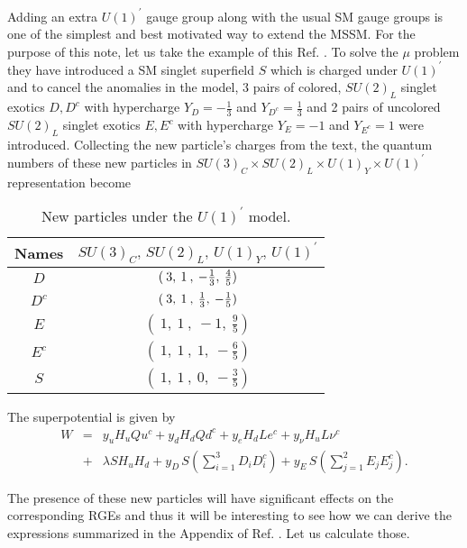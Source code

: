 \documentclass[11pt,prd,superscriptaddress,nofootinbib]{revtex4-1}
\numberwithin{equation}{section}
\newcommand{\uonep}{\ensuremath{U(1)^\prime}}
\begin{document}
Adding an extra $\uonep$ gauge group along with the usual SM gauge groups is one of the simplest and best motivated way to extend the MSSM. For the purpose of this note, let us take the example of this Ref. \cite{deBlas:2009vx}. To solve the $\mu$ problem they have introduced a SM singlet superfield $S$ which is charged under $\uonep$ and to cancel the anomalies in the model, 3 pairs of colored, $SU(2)_L$ singlet exotics $D, D^c$ with hypercharge $Y_D = -\frac{1}{3}$ and $Y_{D^c} = \frac{1}{3}$ and 2 pairs of uncolored $SU(2)_L$ singlet exotics $E, E^c$ with hypercharge $Y_E = −1$ and $Y_{E^c} = 1$ were introduced. Collecting the new particle's charges from the text, the quantum numbers of these new particles in $SU(3)_C\times SU(2)_L\times U(1)_Y\times \uonep $ representation become

\begin{table}[H]
\begin{center}
\begin{tabular}{|c|c|}
\hline
Names  & $SU(3)_C ,\, SU(2)_L ,\, U(1)_Y,\, \uonep$
\\  \hline\hline
 $D$ & $(\>{ 3},\>{ 1}\>,\>-{1\over 3},\>\frac{4}{5})$
\\ \hline
 $D^c$ & $(\>{ 3},\>{ 1}\>,\>{1\over 3},\>-\frac{1}{5})$
\\ \hline
 $E$ & $(\>{ 1},\>{ 1}\>,\> -1,\>\frac{9}{5})$
\\ \hline
 $E^c$ & $(\>{ 1},\>{ 1}\>,\> 1,\>-\frac{6}{5})$
\\ \hline
$S$ & $(\>{ 1},\>{ 1}\>,\> 0,\>-\frac{3}{5})$
\\ \hline
\end{tabular}
\caption{New particles under the $\uonep$ model.\label{tab:uonep}}
\vspace{-0.6cm}
\end{center}
\end{table}


The superpotential is given by
\begin{eqnarray}
\label{U1ppot}
W&=& y_u  {H}_u {Q} {u}^c + y_d  {H}_d {Q} {d}^c + y_e  {H}_d {L} {e}^c+y_\nu  {H}_u {L} {\nu}^c
\\\nonumber
&+&\lambda  {S}  {H}_u  {H}_d+ y_D\, S\left( \sum_{i=1}^{3}  D_i D_i^c \right) +y_E\, S\left (\sum_{j=1}^{2} E_j E_j^c\right).
\end{eqnarray}

\noindent
The presence of these new particles will have significant effects on the corresponding RGEs and thus it will be interesting to see how we can derive the expressions summarized in the Appendix of Ref. \cite{deBlas:2009vx}. Let us calculate those.
\end{document}
